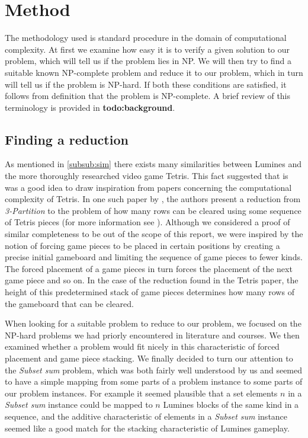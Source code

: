 \section{Method}

The methodology used is standard procedure in the domain of computational complexity. At first we examine how easy it is to verify a given solution to our problem, which will tell us if the problem lies in NP. We will then try to find a suitable known NP-complete problem and reduce it to our problem, which in turn will tell us if the problem is NP-hard. If both these conditions are satisfied, it follows from definition that the problem is NP-complete. A brief review of this terminology is provided in \textbf{todo:background}.

\subsection{Finding a reduction}
As mentioned in \ref{subsub:sim} there exists many similarities between Lumines and the more thoroughly researched video game Tetris. This fact suggested that is was a good idea to draw inspiration from papers concerning the computational complexity of Tetris. In one such paper by \citeauthor{tetris}, the authors present a reduction from \textit{3-Partition} to the problem of how many rows can be cleared using some sequence of Tetris pieces (for more information see \cite{tetris}). Although we considered a proof of similar completeness to be out of the scope of this report, we were inspired by the notion of forcing game pieces to be placed in certain positions by creating a precise initial gameboard and limiting the sequence of game pieces to fewer kinds. The forced placement of a game pieces in turn forces the placement of the next game piece and so on. In the case of the reduction found in the Tetris paper, the height of this predetermined stack of game pieces determines how many rows of the gameboard that can be cleared.

When looking for a suitable problem to reduce to our problem, we focused on the NP-hard problems we had priorly encountered in literature and courses. We then examined whether a problem would fit nicely in this characteristic of forced placement and game piece stacking. We finally decided to turn our attention to the \textit{Subset sum} problem, which was both fairly well understood by us and seemed to have a simple mapping from some parts of a problem instance to some parts of our problem instances. For example it seemed plausible that a set elements $n$ in a \textit{Subset sum} instance could be mapped to $n$ Lumines blocks of the same kind in a sequence, and the additive characteristic of elements in a \textit{Subset sum} instance seemed like a good match for the stacking characteristic of Lumines gameplay.
